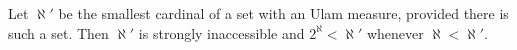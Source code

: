 Let $\aleph'$ be the smallest cardinal of a set with an Ulam measure, provided there is such a set. Then $\aleph'$ is strongly inaccessible and $2^{\aleph} < \aleph'$ whenever $\aleph < \aleph'$.
